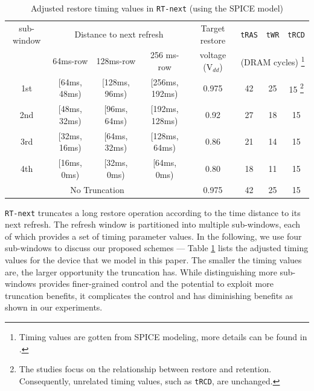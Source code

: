 \begin{savenotes}
\begin{table}[htbp]
\vspace{-0.2in}
\begin{center}
\caption{Adjusted restore timing values in {\tt RT-next}  (using the SPICE model)}
\vspace{-0.15in}
\label{rt_next_timing}
\scalebox{0.75}
{
\begin{tabular}{|c||c|c|c|c|*3c|}
\hline\hline
sub-window& \multicolumn{3}{|c|}{Distance to next refresh} & Target restore     &{\tt tRAS}	  &{\tt tWR}	  &{\tt tRCD}\\
            & 64ms-row & 128ms-row & 256 ms-row              & voltage (V$_{dd}$) &\multicolumn{3}{c|}{(DRAM cycles) \footnote{Timing values are gotten from SPICE modeling, more details can be found in \cite{HPCA16:twr}.}} \\ \hline \hline
1st         & [64ms, 48ms) & [128ms, 96ms) & [256ms, 192ms)  & 0.975		&42		&25	   	&15 \footnote{The studies focus on the relationship between restore and retention. Consequently, unrelated timing values, such as {\tt tRCD}, are unchanged.}  \\ \hline
2nd         & [48ms, 32ms) & [96ms, 64ms) & [192ms, 128ms)   & 0.92          	&27      &18    	&15  \\ \hline
3rd         & [32ms, 16ms) & [64ms, 32ms) & [128ms, 64ms)    & 0.86          	&21      &14    	&15  \\ \hline
4th         & [16ms, 0ms) & [32ms, 0ms) & [64ms, 0ms)        & 0.80          	&18      &11     &15  \\ \hline \hline
\multicolumn{4}{|c|}{No Truncation}            &0.975		&42		&25    	&15  \\ \hline \hline
\end{tabular}
}
\end{center}
\vspace{-0.1in}
\end{table}
\end{savenotes}

{\tt RT-next} truncates a long restore operation according to the time distance to its next refresh. %
The refresh window is partitioned into multiple sub-windows, each of which provides a set of timing parameter values.
In the following, we use four sub-windows to discuss our proposed schemes --- Table \ref{rt_next_timing} lists the adjusted timing values for the device that we model in this paper. The smaller the timing values are, the larger opportunity the truncation has. While distinguishing more sub-windows provides finer-grained control and the potential to exploit more truncation benefits, it complicates the control and has diminishing benefits as shown in our experiments. 

